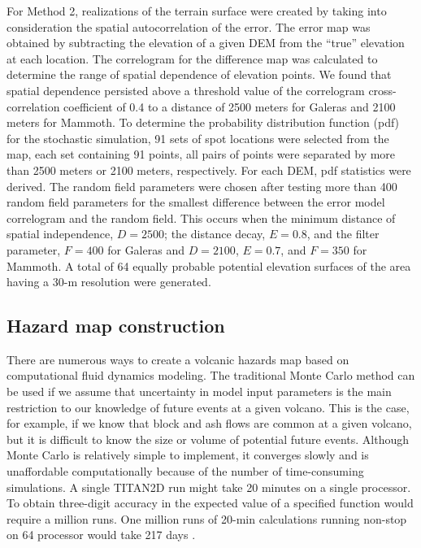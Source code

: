\documentclass[12pt]{article}
\begin{document}
For Method 2, realizations of the terrain surface were created by
taking into consideration the spatial autocorrelation of the error.
The error map was obtained by subtracting the elevation of a given DEM
from the ``true'' elevation at each location. The correlogram for the
difference map was calculated to determine the range of spatial
dependence of elevation points. We found that spatial dependence
persisted above a threshold value of the correlogram cross-correlation
coefficient of 0.4 to a distance of 2500 meters for Galeras and 2100
meters for Mammoth. To determine the probability distribution function
(pdf) for the stochastic simulation, 91 sets of spot locations were
selected from the map, each set containing 91 points, all pairs of
points were separated by more than 2500 meters or 2100 meters,
respectively. For each DEM, pdf statistics were derived.  The random
field parameters were chosen after testing more than 400 random field
parameters for the smallest difference between the error model
correlogram and the random field.  This occurs when the minimum
distance of spatial independence, $D =2500$; the distance decay, $E =
0.8$, and the filter parameter, $F =400$ for Galeras and $D =2100$, $E
= 0.7$, and $F =350$ for Mammoth.  A total of 64 equally probable
potential elevation surfaces of the area having a 30-m resolution were
generated.

\subsection{Hazard map construction}
 
There are numerous ways to create a volcanic hazards map based on
computational fluid dynamics modeling.  The traditional Monte Carlo
method can be used if we assume that uncertainty in model input
parameters is the main restriction to our knowledge of future events
at a given volcano.  This is the case, for example, if we know that
block and ash flows are common at a given volcano, but it is difficult
to know the size or volume of potential future events.  Although Monte
Carlo is relatively simple to implement, it converges slowly and is
unaffordable computationally because of the number of time-consuming
simulations.  A single TITAN2D run might take 20 minutes on a single
processor. To obtain three-digit accuracy in the expected value of a
specified function would require a million runs. One million runs of
20-min calculations running non-stop on 64 processor would take 217
days \citep{Keith}.
\end{document}

